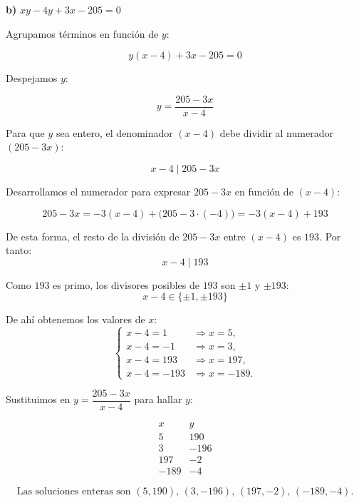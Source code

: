 \documentclass[a4paper,12pt]{article}
\begin{document}
\begin{ejercicio}[title=Ejercicio 19]
\textbf{b) } $xy - 4y + 3x - 205 = 0$

\vspace{0.3em}
Agrupamos términos en función de $y$:

\[
y(x - 4) + 3x - 205 = 0
\]

Despejamos $y$:

\[
y = \frac{205 - 3x}{x - 4}
\]

Para que $y$ sea entero, el denominador $(x - 4)$ debe dividir al numerador $(205 - 3x)$:

\[
x - 4 \mid 205 - 3x
\]

Desarrollamos el numerador para expresar $205 - 3x$ en función de $(x-4)$:

\[
205 - 3x = -3(x - 4) + \big(205 - 3\cdot(-4)\big) = -3(x - 4) + 193
\]

De esta forma, el resto de la división de $205 - 3x$ entre $(x - 4)$ es $193$.  
Por tanto:
\[
x - 4 \mid 193
\]

Como $193$ es primo, los divisores posibles de $193$ son $\pm1$ y $\pm193$:
\[
x - 4 \in \{\pm1, \pm193\}
\]

De ahí obtenemos los valores de $x$:
\[
\begin{cases}
x - 4 = 1 &\Rightarrow x = 5,\\[0.3em]
x - 4 = -1 &\Rightarrow x = 3,\\[0.3em]
x - 4 = 193 &\Rightarrow x = 197,\\[0.3em]
x - 4 = -193 &\Rightarrow x = -189.
\end{cases}
\]

Sustituimos en $y = \dfrac{205 - 3x}{x - 4}$ para hallar $y$:

\[
\begin{array}{c|c}
x & y \\
\hline
5 & 190\\
3 & -196\\
197 & -2\\
-189 & -4
\end{array}
\]

\vspace{0.5em}

\[
\boxed{\text{Las soluciones enteras son } (5,190),\, (3,-196),\, (197,-2),\, (-189,-4).}
\]

\end{ejercicio}
\end{document}

